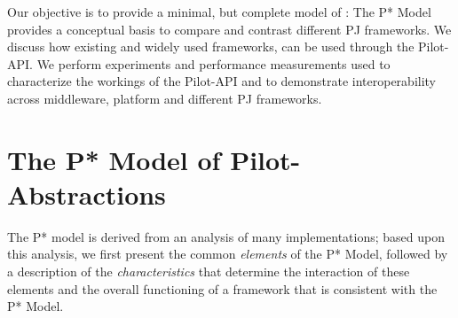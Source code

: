 \documentclass{sig-alternate}
\begin{document}
Our objective is to provide a minimal, but complete model of
\pilotjobs: The P* Model provides a conceptual basis to compare and
contrast different PJ frameworks.  We discuss how existing and widely
used \pilotjob frameworks, can be used through the Pilot-API. We
perform experiments and performance measurements used to characterize
the workings of the Pilot-API and to demonstrate interoperability
across middleware, platform and different PJ frameworks. 










\section{The P* Model of Pilot-\\Abstractions}
\label{sec:pilot-model}

The P* model is derived from an analysis of many \pilotjob
implementations; based upon this analysis, we first present the common
{\it elements} of the P* Model, followed by a description of the {\it
  characteristics} that determine the interaction of these elements
and the overall functioning of a \pilotjob framework that is
consistent with the P* Model.
\end{document}
